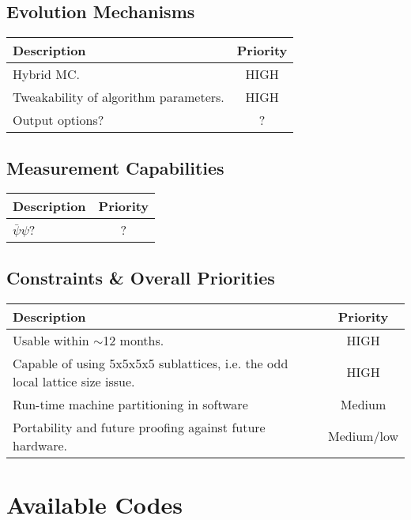 \documentclass[12pt]{article}
\begin{document}
\subsection{Evolution Mechanisms}
\begin{center}
 \begin{tabular}{lc}
 \hline
 \bf{Description} & \bf{Priority}\\
 \hline
 Hybrid MC. & HIGH \\
 Tweakability of algorithm parameters. & HIGH \\
 Output options? & ? \\
 \hline
 \end{tabular}
\end{center}

\subsection{Measurement Capabilities}
\begin{center}
 \begin{tabular}{lc}
 \hline
 \bf{Description} & \bf{Priority}\\
 \hline
  $\bar{\psi}\psi$? & ?\\
 \hline
 \end{tabular}
\end{center}

\subsection{Constraints \& Overall Priorities}
\begin{center}
 \begin{tabular}{lc}
 \hline
 \bf{Description} & \bf{Priority}\\
 \hline
  Usable within $\sim$12 months. & HIGH \\
  Capable of using 5x5x5x5 sublattices, i.e. the odd local lattice
 size issue. &HIGH \\
  Run-time machine partitioning in software & Medium \\
 Portability and future proofing against future hardware. & Medium/low \\
 \hline
 \end{tabular}
\end{center}

\section{Available Codes}
\label{oldcodes}
\end{document}
